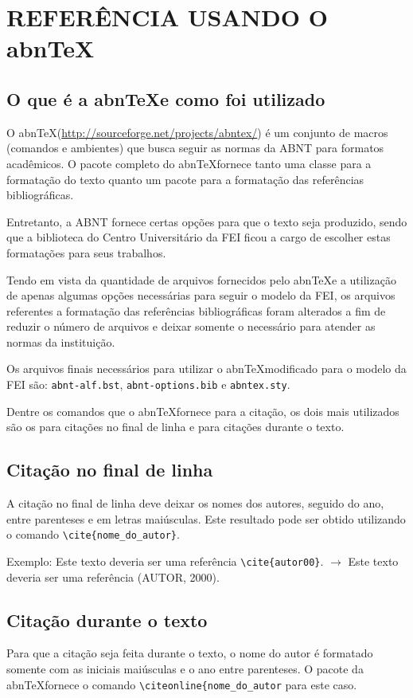 \chapter{REFERÊNCIA USANDO O abn\TeX}\label{chap:referencia}

    \section{O que é a abn\TeX e como foi utilizado}

    O abn\TeX (\href{http://sourceforge.net/projects/abntex/}{http://sourceforge.net/projects/abntex/}) é um conjunto de macros (comandos e ambientes) que busca seguir as normas da ABNT para formatos acadêmicos. O pacote completo do abn\TeX fornece tanto uma classe para a formatação do texto quanto um pacote para a formatação das referências bibliográficas.

    Entretanto, a ABNT fornece certas opções para que o texto seja produzido, sendo que a biblioteca do Centro Universitário da FEI ficou a cargo de escolher estas formatações para seus trabalhos.

    Tendo em vista da quantidade de arquivos fornecidos pelo abn\TeX e a utilização de apenas algumas opções necessárias para seguir o modelo da FEI, os arquivos referentes a formatação das referências bibliográficas foram alterados a fim de reduzir o número de arquivos e deixar somente o necessário para atender as normas da instituição.

    Os arquivos finais necessários para utilizar o abn\TeX modificado para o modelo da FEI são: \texttt{abnt-alf.bst}, \texttt{abnt-options.bib} e \texttt{abntex.sty}.

    Dentre os comandos que o abn\TeX fornece para a citação, os dois mais utilizados são os para citações no final de linha e para citações durante o texto.

    \section{Citação no final de linha}
    A citação no final de linha deve deixar os nomes dos autores, seguido do ano, entre parenteses e em letras maiúsculas. Este resultado pode ser obtido utilizando o comando \verb+\cite{nome_do_autor}+.

    Exemplo: Este texto deveria ser uma referência \verb+\cite{autor00}+. $\to$ Este texto deveria ser uma referência (AUTOR, 2000).

    \section{Citação durante o texto}
    Para que a citação seja feita durante o texto, o nome do autor é formatado somente com as iniciais maiúsculas e o ano entre parenteses. O pacote da abn\TeX fornece o comando \verb+\citeonline{nome_do_autor+ para este caso.

